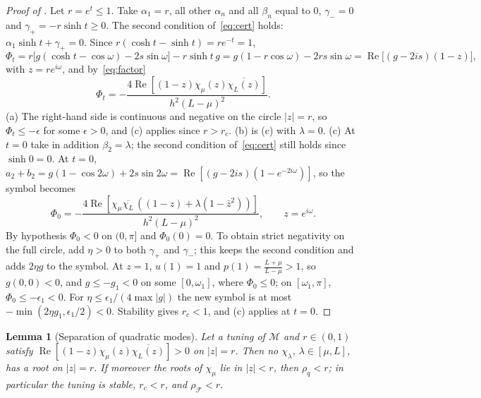 \documentclass[11pt]{article}
\newtheorem{lemma}[theorem]{Lemma}
\theoremstyle{definition}
\theoremstyle{remark}
\newcommand{\cF}{\mathcal F}
\newcommand{\cM}{\mathcal M}
\newcommand{\ch}{\cosh}
\newcommand{\sh}{\sinh}
\newcommand{\Rea}{\operatorname{Re}}
\newcommand{\rhoF}{\rho_{\cF}}
\begin{document}
\begin{proof}[Proof of ]
Let \(r=e^t\le1\).  Take \(\alpha_1=r\), all other \(\alpha_n\) and all \(\beta_n\) equal to \(0\),
\(\gamma_-=0\) and \(\gamma_+=-r\sh t\ge0\).  The second condition of~\eqref{eq:cert} holds:
\(\alpha_1\sh t+\gamma_+=0\).  Since \(r(\ch t-\sh t)=re^{-t}=1\),
\[
\Phi_t=r\bigl[g(\ch t-\cos\omega)-2s\sin\omega\bigr]-r\sh t\,g=g(1-r\cos\omega)-2rs\sin\omega
=\Rea\bigl[(g-2is)(1-z)\bigr],
\]
with \(z=re^{i\omega}\), and by~\eqref{eq:factor}
\[
\Phi_t=-\frac{4\Rea[(1-z)\chi_\mu(z)\overline{\chi_L(z)}]}{h^2(L-\mu)^2}.
\]
(a) The right-hand side is continuous and negative on the circle \(|z|=r\), so
\(\Phi_t\le-\epsilon\) for some \(\epsilon>0\), and (c) applies since \(r>r_c\).
(b) is (c) with \(\lambda=0\).
(c) At \(t=0\) take in addition \(\beta_2=\lambda\); the second condition of~\eqref{eq:cert} still
holds since \(\sh0=0\).  At \(t=0\), \(a_2+b_2=g(1-\cos2\omega)+2s\sin2\omega=\Rea[(g-2is)(1-e^{-2i\omega})]\),
so the symbol becomes
\[
\Phi_0=-\frac{4\Rea[\chi_\mu\overline{\chi_L}\,((1-z)+\lambda(1-\bar z^2))]}{h^2(L-\mu)^2},\qquad z=e^{i\omega}.
\]
By hypothesis \(\Phi_0<0\) on \((0,\pi]\) and \(\Phi_0(0)=0\).
To obtain strict negativity on the full circle, add \(\eta>0\) to both \(\gamma_+\) and \(\gamma_-\); this keeps the second condition and
adds \(2\eta g\) to the symbol.  At \(z=1\), \(u(1)=1\) and \(p(1)=\frac{L+\mu}{L-\mu}>1\), so
\(g(0,0)<0\), and \(g\le-g_1<0\) on some \([0,\omega_1]\), where \(\Phi_0\le0\); on \([\omega_1,\pi]\),
\(\Phi_0\le-\epsilon_1<0\).  For \(\eta\le\epsilon_1/(4\max|g|)\) the new symbol is at most
\(-\min(2\eta g_1,\epsilon_1/2)<0\).  Stability gives \(r_c<1\), and (c) applies at
\(t=0\).
\end{proof}

\begin{lemma}[Separation of quadratic modes]\label{lem:separate}
Let a tuning of \(\cM\) and \(r\in(0,1)\) satisfy \(\Rea[(1-z)\chi_\mu(z)\overline{\chi_L(z)}]>0\) on \(|z|=r\).  Then no \(\chi_\lambda\),
\(\lambda\in[\mu,L]\), has a root on \(|z|=r\).  If moreover the roots of \(\chi_\mu\) lie in \(|z|<r\), then \(\rho_q<r\); in particular
the tuning is stable, \(r_c<r\), and \(\rhoF<r\).
\end{lemma}
\end{document}
